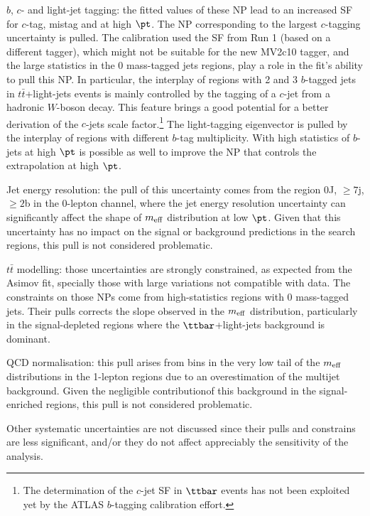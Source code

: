  \ib $b$, $c$- and light-jet tagging: the fitted values of these NP lead to an increased SF for $c$-tag, mistag and at high $\pt$. The NP corresponding to the largest $c$-tagging uncertainty is pulled. The calibration used the SF from Run 1 (based on a different tagger), which might not be suitable for the new MV2c10 tagger, and the large statistics in the 0 mass-tagged jets regions, play a role in the fit's ability to pull this NP. In particular, the interplay of regions with 2 and 3 $b$-tagged jets in $t\bar{t}$+light-jets events is mainly controlled by the tagging of a $c$-jet from a hadronic $W$-boson decay. This feature brings a good potential for a better derivation of the $c$-jets scale factor.\footnote{The determination of the $c$-jet SF in $\ttbar$ events has not been exploited yet by the ATLAS $b$-tagging calibration effort.} The light-tagging eigenvector is pulled by the interplay of regions with different $b$-tag multiplicity. With high statistics of $b$-jets at high $\pt$ is possible as well to improve the NP that controls the extrapolation at high $\pt$.

\ib Jet energy resolution: the pull of this uncertainty comes from the region $0$J, $\ge7$j, $\ge2$b in the 0-lepton channel, where the jet energy resolution uncertainty can significantly affect the shape of $m_{\rm eff}$ distribution at low $\pt$. Given that this uncertainty has no impact on the signal or background predictions in the search regions, this pull is not considered problematic.
 
\ib $t\bar{t}$ modelling: those uncertainties are strongly constrained, as expected from the Asimov fit, specially those with large variations not compatible with data. The constraints on those NPs come from high-statistics regions with 0 mass-tagged jets. Their pulls corrects the slope observed in the $m_{\rm eff}$ distribution, particularly in the signal-depleted regions where the $\ttbar$+light-jets background is dominant.
 
\ib QCD normalisation: this pull arises from bins in the very low tail of the $m_{\rm eff}$ distributions in the 1-lepton regions due to an overestimation of the multijet background. Given the negligible contributionof this background in the signal-enriched regions, this pull is not considered problematic.
\ei


Other systematic uncertainties are not discussed since their pulls and constrains are less significant, and/or they do not affect appreciably the sensitivity of the analysis.

